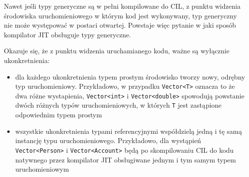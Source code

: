 Nawet jeśli typy generyczne są w pełni kompilowane do CIL, z punktu widzenia środowiska uruchomieniowego w którym
kod jest wykonywany, typ generyczny nie może występować w postaci otwartej. Powstaje więc pytanie w jaki sposób
kompilator JIT obsługuje typy generyczne.

Okazuje się, że z punktu widzenia uruchamianego kodu, ważne są wyłącznie ukonkretnienia:
\begin{itemize}
\item dla każdego ukonkretnienia typem prostym środowisko tworzy nowy, odrębny typ uruchomieniowy. Przykładowo, w przypadku
{\tt Vector<T>} oznacza to że dwa różne wystapienia, {\tt Vector<int>} i {\tt Vector<double>} spowodują powstanie
dwóch różnych typów uruchomieniowych, w których {\tt T} jest zastąpione odpowiednim typem prostym
\item wszystkie ukonkretnienia typami referencyjnymi współdzielą jedną i tę samą instancję typu uruchomieniowego.
Przykładowo, dla wystąpień {\tt Vector<Person>} i {\tt Vector<Account>} będą po skompilowaniu CIL do kodu natywnego
przez kompilator JIT obsługiwane jednym i tym samym typem uruchomieniowym
\end{itemize}